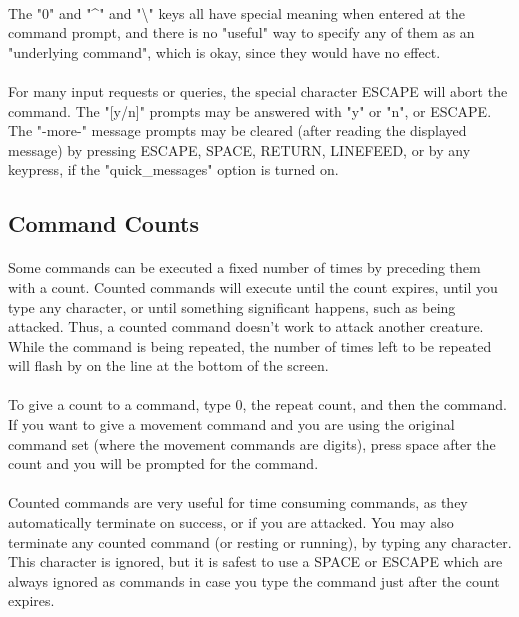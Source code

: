 \paragraph{}The "0" and "\^{}" and "\textbackslash " keys all have special meaning when entered
at the command prompt, and there is no "useful" way to specify any of them
as an "underlying command", which is okay, since they would have no effect.

\paragraph{}For many input requests or queries, the special character ESCAPE
will abort the command. The "[y/n]" prompts may be answered with "y" or
"n", or ESCAPE. The "-more-" message prompts may be cleared (after reading
the displayed message) by pressing ESCAPE, SPACE, RETURN, LINEFEED, or by
any keypress, if the "quick\_messages" option is turned on.
 

\subsection{Command Counts}
\paragraph{}Some commands can be executed a fixed number of times by preceding
them with a count. Counted commands will execute until the count expires,
until you type any character, or until something significant happens, such
as being attacked. Thus, a counted command doesn't work to attack another
creature. While the command is being repeated, the number of times left
to be repeated will flash by on the line at the bottom of the screen.

\paragraph{}To give a count to a command, type 0, the repeat count, and then
the command. If you want to give a movement command and you are using the
original command set (where the movement commands are digits), press space
after the count and you will be prompted for the command.
 
\paragraph{}Counted commands are very useful for time consuming commands, as
they automatically terminate on success, or if you are attacked. You may
also terminate any counted command (or resting or running), by typing any
character. This character is ignored, but it is safest to use a SPACE or
ESCAPE which are always ignored as commands in case you type the command
just after the count expires.

